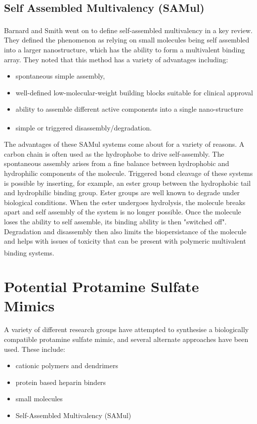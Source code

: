 \subsection{Self Assembled Multivalency (SAMul)}
Barnard and Smith went on to define self-assembled multivalency in a key review.\textsuperscript{\cite{Barnard2012Self-AssembledBinding}} They defined the phenomenon as relying on small molecules being self assembled into a larger nanostructure, which has the ability to form a multivalent binding array. They noted that this method has a variety of advantages including:
\begin{itemize}
\item spontaneous simple assembly, 
\item well-defined low-molecular-weight building blocks suitable for clinical approval
\item ability to assemble different active components into a single nano-structure
\item simple or triggered disassembly/degradation.\textsuperscript{\cite{Bromfield2013HeparinApplications,Barnard2012Self-AssembledBinding}}
\end{itemize}
The advantages of these SAMul systems come about for a variety of reasons. A carbon chain is often used as the hydrophobe to drive self-assembly. The spontaneous assembly arises from a fine balance between hydrophobic and hydrophilic components of the molecule.   
\newline 
Triggered bond cleavage of these systems is possible by inserting, for example, an ester group between the hydrophobic tail and hydrophilic binding group. Ester groups are well known to degrade under biological conditions. When the ester undergoes hydrolysis, the molecule breaks apart and self assembly of the system is no longer possible. Once the molecule loses the ability to self assemble, its binding ability is then "switched off". 
\newline
Degradation and disassembly then also limits the biopersistance of the molecule and helps with issues of toxicity that can be present with polymeric multivalent binding systems.\textsuperscript{\cite{Rodrigo2011Self-AssemblingBinding, Barnard2012Self-AssembledBinding}}

\newpage
\section{Potential Protamine Sulfate Mimics}
A variety of different research groups have attempted to synthesise a biologically compatible protamine sulfate mimic, and several alternate approaches have been used. These include:
\begin{itemize}
\item  cationic polymers and dendrimers
\item protein based heparin binders
\item small molecules
\item Self-Assembled Multivalency (SAMul)
\end{itemize}
